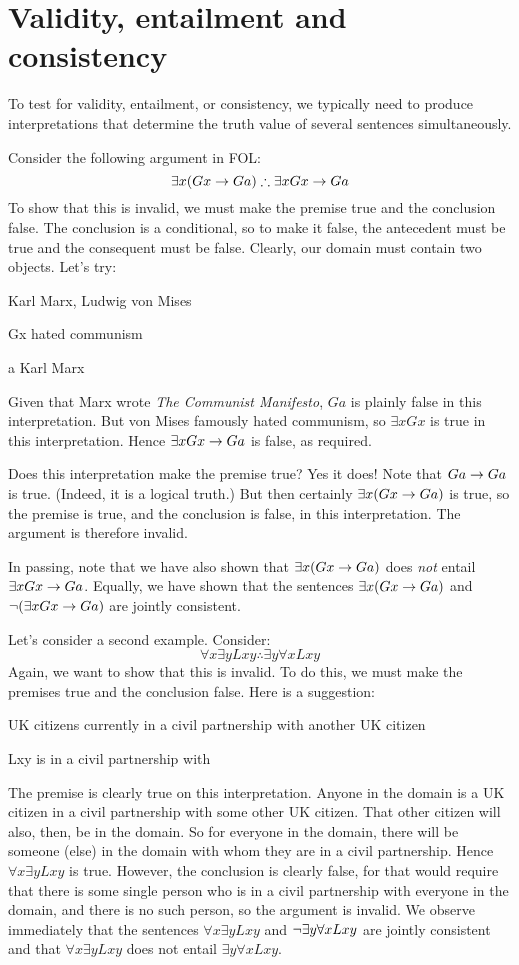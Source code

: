 \section{Validity, entailment and consistency}
To test for validity, entailment, or consistency, we typically need to produce interpretations that determine the truth value of several sentences simultaneously.

Consider the following argument in FOL:
$$\exists x(Gx \eif Ga) \therefore \exists x Gx \eif Ga$$
To show that this is invalid, we must make the premise true and the conclusion false. The conclusion is a conditional, so to make it false, the antecedent must be true and the consequent must be false. Clearly, our domain must contain two objects. Let's try:
	\begin{ekey}
		\item[\text{domain}] Karl Marx, Ludwig von Mises
		\item[Gx]  hated communism
		\item[a] Karl Marx
	\end{ekey}
Given that Marx wrote \emph{The Communist Manifesto}, $Ga$ is plainly false in this interpretation. But von Mises famously hated communism, so $\exists x Gx$ is true in this interpretation. Hence $\exists x Gx \rightarrow Ga$ is false, as required.

Does this interpretation make the premise true? Yes it does! Note that $Ga \rightarrow Ga$ is true. (Indeed, it is a logical truth.) But then certainly $\exists x (Gx \rightarrow Ga)$ is true, so the premise is true, and the conclusion is false, in this interpretation. The argument is therefore invalid.

In passing, note that we have also shown that $\exists x(Gx \rightarrow Ga)$ does \emph{not} entail $\exists x Gx \rightarrow Ga$. Equally, we have shown that the sentences $\exists x (Gx \rightarrow Ga)$ and $\neg (\exists x Gx \rightarrow Ga)$ are jointly consistent.

Let's consider a second example. Consider:
	$$\forall x \exists y Lxy \therefore \exists y \forall x Lxy$$
Again, we want to show that this is invalid. To do this, we must make the premises true and the conclusion false. Here is a suggestion:
	\begin{ekey}
		\item[\text{domain}] UK citizens currently in a civil partnership with another UK citizen
		\item[Lxy]  is in a civil partnership with \gap{y}
	\end{ekey}
The premise is clearly true on this interpretation. Anyone in the domain is a UK citizen in a civil partnership with some other UK citizen. That other citizen will also, then, be in the domain. So for everyone in the domain, there will be someone (else) in the domain with whom they are in a civil partnership. Hence $\forall x \exists y Lxy$ is true. However, the conclusion is clearly false, for that would require that there is some single person who is in a civil partnership with everyone in the domain, and there is no such person, so the argument is invalid. We observe immediately that the sentences $\forall x \exists y Lxy$ and $\neg\exists y \forall x Lxy$ are jointly consistent and that $\forall x \exists y Lxy$ does not entail $\exists y \forall x Lxy$.

